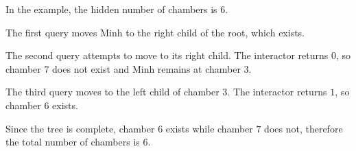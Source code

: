 In the example, the hidden number of chambers is $6$.

The first query moves Minh to the right child of the root, which exists.

The second query attempts to move to its right child. The interactor returns $0$, so chamber $7$ does not exist and Minh remains at chamber $3$.

The third query moves to the left child of chamber $3$. The interactor returns $1$, so chamber $6$ exists.

Since the tree is complete, chamber $6$ exists while chamber $7$ does not, therefore the total number of chambers is $6$.